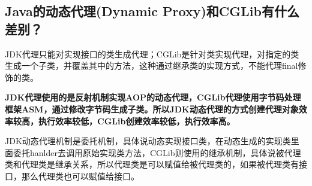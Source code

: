 \documentclass[../../../interview-questions.tex]{subfiles}
\begin{document}
\subsection{Java的动态代理(Dynamic Proxy)和CGLib有什么差别？}

JDK代理只能对实现接口的类生成代理；CGLib是针对类实现代理，对指定的类生成一个子类，并覆盖其中的方法，这种通过继承类的实现方式，不能代理final修饰的类。

\textbf{JDK代理使用的是反射机制实现AOP的动态代理，CGLib代理使用字节码处理框架ASM，通过修改字节码生成子类。所以JDK动态代理的方式创建代理对象效率较高，执行效率较低，CGLib创建效率较低，执行效率高。}

JDK动态代理机制是委托机制，具体说动态实现接口类，在动态生成的实现类里面委托hanlder去调用原始实现类方法，CGLib则使用的继承机制，具体说被代理类和代理类是继承关系，所以代理类是可以赋值给被代理类的，如果被代理类有接口，那么代理类也可以赋值给接口。
\end{document}
